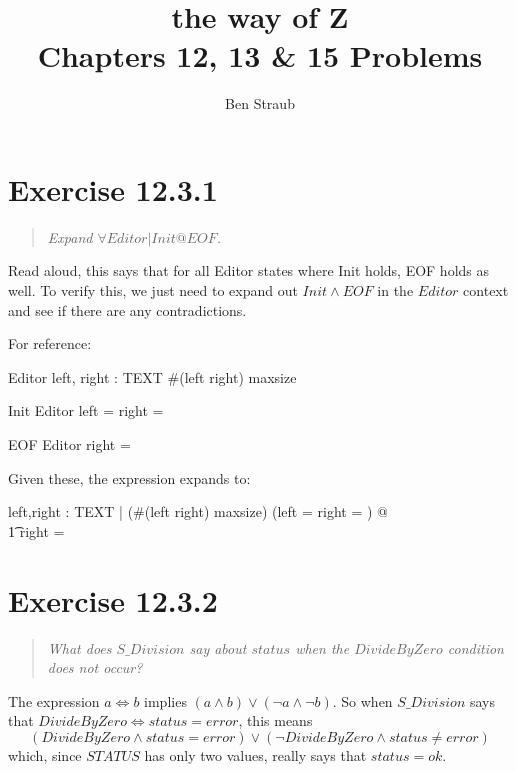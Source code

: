 \documentclass[10pt]{article}
\begin{document}
\title{the way of Z \\ Chapters 12, 13 \& 15 Problems}
\author{Ben Straub}
\maketitle

\section{Exercise 12.3.1}
\begin{quote}
  {\it
    Expand $\forall Editor | Init @ EOF$.
  }
\end{quote}
Read aloud, this says that for all Editor states where Init holds, EOF holds as well. To verify
this, we just need to expand out $Init \land EOF$ in the $Editor$ context and see if there are any
contradictions.

For reference:
\begin{schema}{Editor}
  left, right : TEXT
  \where
  \#(left \cat right) \leq maxsize
\end{schema}
\begin{schema}{Init}
  Editor
  \where
  left = right = \langle \rangle
\end{schema}
\begin{schema}{EOF}
  Editor
  \where
  right = \langle \rangle  
\end{schema}

Given these, the expression expands to:

\begin{syntax}
  \forall left,right : TEXT | (\#(left \cat right) \leq maxsize) \land (left = right = \langle \rangle) @ \\
  \t1 right = \langle \rangle
\end{syntax}
\tocheck



\section{Exercise 12.3.2}
\begin{quote}
  {\it
    What does $S\_Division$ say about $status$ when the $DivideByZero$ condition does not occur?
  }
\end{quote}

The expression $a \iff b$ implies $(a \land b) \lor (\lnot a \land \lnot b)$.  So when $S\_Division$
says that $DivideByZero \iff status = error$, this means 
\[ (DivideByZero \land status = error) \lor
   (\lnot DivideByZero \land status \neq error) \]
which, since $STATUS$ has only two values, really says that $status = ok$.
\tocheck
\end{document}
